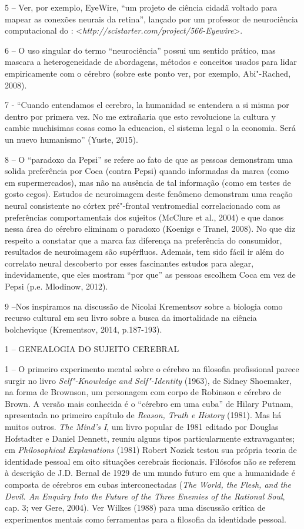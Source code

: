 5 -- Ver, por exemplo, EyeWire, ``um projeto de ciência cidadã voltado
para mapear as conexões neurais da retina'', lançado por um professor de
neurociência computacional do :
\textless{}\emph{http://scistarter.com/project/566-Eyewire}\textgreater{}.

6 -- O uso singular do termo ``neurociência'' possui um sentido prático,
mas mascara a heterogeneidade de abordagens, métodos e conceitos usados
para lidar empiricamente com o cérebro (sobre este ponto ver, por
exemplo, Abi"-Rached, 2008).

7 - ``Cuando entendamos el cerebro, la humanidad se entendera a si misma
por dentro por primera vez. No me extrañaria que esto revolucione la
cultura y cambie muchisimas cosas como la educacion, el sistema legal o
la economia. Será un nuevo humanismo'' (Yuste, 2015).

8 -- O ``paradoxo da Pepsi'' se refere ao fato de que as pessoas
demonstram uma solida preferência por Coca (contra Pepsi) quando
informadas da marca (como em supermercados), mas não na ausência de tal
informação (como em testes de gosto cegos). Estudos de neuroimagem deste
fenômeno demonstram uma reação neural consistente no córtex pré"-frontal
ventromedial correlacionado com as preferências comportamentais dos
sujeitos (McClure et al., 2004) e que danos nessa área do cérebro
eliminam o paradoxo (Koenigs e Tranel, 2008). No que diz respeito a
constatar que a marca faz diferença na preferência do consumidor,
resultados de neuroimagem são supérfluos. Ademais, tem sido fácil ir
além do correlato neural descoberto por esses fascinantes estudos para
alegar, indevidamente, que eles mostram ``por que'' as pessoas escolhem
Coca em vez de Pepsi (p.e. Mlodinow, 2012).

9 --Nos inspiramos na discussão de Nicolai Krementsov sobre a biologia
como recurso cultural em seu livro sobre a busca da imortalidade na
ciência bolchevique (Krementsov, 2014, p.187-193).

1 -- GENEALOGIA DO SUJEITO CEREBRAL

1 -- O primeiro experimento mental sobre o cérebro na filosofia
profissional parece surgir no livro \emph{Self"-Knowledge and
Self"-Identity} (1963), de Sidney Shoemaker, na forma de Brownson, um
personagem com corpo de Robinson e cérebro de Brown. A versão mais
conhecida é o ``cérebro em uma cuba'' de Hilary Putnam, apresentada no
primeiro capítulo de \emph{Reason, Truth e History} (1981). Mas há
muitos outros. \emph{The Mind's I}, um livro popular de 1981 editado por
Douglas Hofstadter e Daniel Dennett, reuniu alguns tipos particularmente
extravagantes; em \emph{Philosophical Explanations} (1981) Robert Nozick
testou sua própria teoria de identidade pessoal em oito situações
cerebrais ficcionais. Filósofos não se referem à descrição de J.D.
Bernal de 1929 de um mundo futuro em que a humanidade é composta de
cérebros em cubas interconectadas (\emph{The World, the Flesh, and the
Devil. An Enquiry Into the Future of the Three Enemies of the Rational
Soul}, cap. 3; ver Gere, 2004). Ver Wilkes (1988) para uma discussão
crítica de experimentos mentais como ferramentas para a filosofia da
identidade pessoal.

